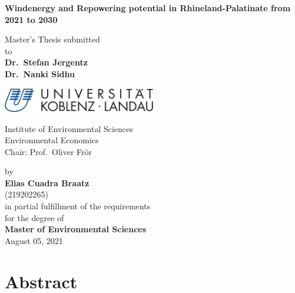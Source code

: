 \documentclass[a4paper,11pt]{article}
\begin{document}
\thispagestyle{empty}
\begin{center}
  \vspace*{5mm}
  \linespread{1.5}
  {\huge{\bf Windenergy and Repowering potential in Rhineland-Palatinate from 2021 to 2030}\par}\vspace{1cm}
  Master's Thesis submitted \\\vspace{0.5cm}
  to \\\vspace{0.5cm}
  \textbf{Dr.~Stefan Jergentz} \\
  \textbf{Dr.~Nanki Sidhu} \\\vspace{1.5cm}
  
  
  \includegraphics[width=0.5\textwidth]{Uni-Logo-2.jpg}
  
  Institute of Environmental Sciences \\
  Environmental Economics \\
   Chair: Prof.~Oliver Frör \\  \vspace{1cm}

  
  
  by \\\vspace{0.5cm}
  \textbf{Elias Cuadra Braatz} \\
  (219202265) \\
  
  \medskip
  \medskip
  in partial fulfillment of the requirements \\
  for the degree of \\
  \textbf{Master of Environmental Sciences} \\\vspace{0.5cm}
  August 05, 2021
  
\end{center}


\newpage
\tableofcontents
\clearpage

\newpage
\hypertarget{abstract}{%
\section*{Abstract}\label{abstract}}
\end{document}

